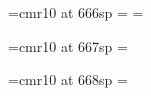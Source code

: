 \newcount\cstRange
\newcount\cstRangeSqrt

\newcount\instance

\newwrite\out

\newcount\wheelmodulus
%
% 
%
%
%
\font\wheelcogids=cmr10 at 666sp
%
%
%
%
%
\fontdimen\wheelmodulus\wheelcogids=\z@
\wheelcogids=\z@
%
%


\font\wheelcognext=cmr10 at 667sp
\fontdimen\wheelmodulus\wheelcognext=\z@

\font\wheelcogdeltas=cmr10 at 668sp
\fontdimen\wheelmodulus\wheelcogdeltas=\z@

